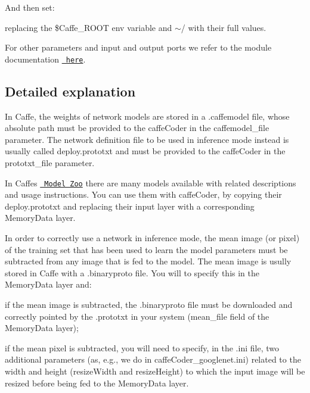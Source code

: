 And then set\+:


\begin{DoxyCode}{0}
\end{DoxyCode}


replacing the {\ttfamily \$\+Caffe\+\_\+\+R\+O\+OT} env variable and {\ttfamily $\sim$/} with their full values.

For other parameters and input and output ports we refer to the module documentation \href{http://robotology.github.io/himrep/doxygen/doc/html/group__caffeCoder.html}{\texttt{ here}}.

\subsection*{Detailed explanation}

In Caffe, the weights of network models are stored in a {\ttfamily .caffemodel} file, whose absolute path must be provided to the {\ttfamily caffe\+Coder} in the {\ttfamily caffemodel\+\_\+file} parameter. The network definition file to be used in inference mode instead is usually called {\ttfamily deploy.\+prototxt} and must be provided to the {\ttfamily caffe\+Coder} in the {\ttfamily prototxt\+\_\+file} parameter.

In Caffe\textquotesingle{}s \href{http://caffe.berkeleyvision.org/model_zoo.html}{\texttt{ Model Zoo}} there are many models available with related descriptions and usage instructions. You can use them with {\ttfamily caffe\+Coder}, by copying their {\ttfamily deploy.\+prototxt} and replacing their input layer with a corresponding {\ttfamily Memory\+Data} layer.

In order to correctly use a network in inference mode, the mean image (or pixel) of the training set that has been used to learn the model parameters must be subtracted from any image that is fed to the model. The mean image is usully stored in Caffe with a {\ttfamily .binaryproto} file. You will to specify this in the {\ttfamily Memory\+Data} layer and\+:


\begin{DoxyItemize}
\item if the mean image is subtracted, the {\ttfamily .binaryproto} file must be downloaded and correctly pointed by the {\ttfamily .prototxt} in your system ({\ttfamily mean\+\_\+file} field of the {\ttfamily Memory\+Data} layer);
\item if the mean pixel is subtracted, you will need to specify, in the {\ttfamily .ini} file, two additional parameters (as, e.\+g., we do in {\ttfamily caffe\+Coder\+\_\+googlenet.\+ini}) related to the width and height ({\ttfamily resize\+Width} and {\ttfamily resize\+Height}) to which the input image will be resized before being fed to the {\ttfamily Memory\+Data} layer.
\end{DoxyItemize}

